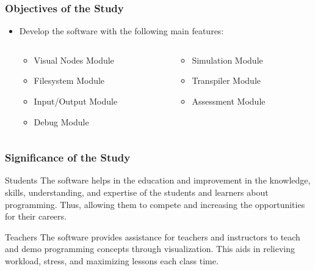 \documentclass[handout]{beamer}
\newcommand{\parx}{
	\setlength{\parindent}{4em}
	\par}
\begin{document}
\begin{frame}
	\frametitle{Objectives of the Study}
	\justifying
	\parx
	\begin{itemize}
		\item<1-> Develop the software with the following main features:
		\begin{columns}
			\begin{column}{.5\linewidth}
				\begin{itemize}
						\item<2-> Visual Nodes Module
						\item<3-> Filesystem Module
						\item<4-> Input/Output Module
						\item<5-> Debug Module
				\end{itemize}
			\end{column}
			\begin{column}{.5\linewidth}
				\begin{itemize}
						\item<9-> Simulation Module
						\item<7-> Transpiler Module
						\item<8-> Assessment Module
				\end{itemize}
			\end{column}
		\end{columns}
	\end{itemize}
\end{frame}

\begin{frame}
	\frametitle{Significance of the Study}
	\begin{block}{Students}
		The software helps in the education and improvement in the knowledge,
		skills, understanding, and expertise of the students and learners about
		programming. Thus, allowing them to compete and increasing the
		opportunities for their careers.
	\end{block}

	\begin{block}{Teachers}
		The software provides assistance for teachers and instructors to teach and
		demo programming concepts through visualization. This aids in relieving workload,
		stress, and maximizing lessons each class time.
	\end{block}
\end{frame}
\end{document}
